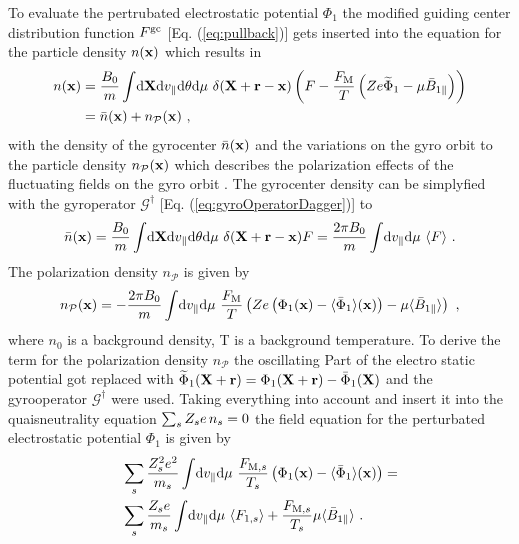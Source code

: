 To evaluate the pertrubated electrostatic potential $\Phi_1$ the modified guiding center distribution function $F^\mathrm{gc}$ [Eq. (\ref{eq:pullback})] gets inserted into the equation for the particle density $n(\boldsymbol{\mathbf{x}})$ which results in
\begin{gather}
	\begin{aligned}
		n(\boldsymbol{\mathbf{x}}) &= \frac{B_0}{m} \int \! \mathrm{d}\boldsymbol{\mathbf{X}}\mathrm{d}v_\parallel\mathrm{d}\theta\mathrm{d}\mu ~ \delta(\boldsymbol{\mathbf{X}} + \boldsymbol{\mathbf{r}} - \boldsymbol{\mathbf{x}}) \left(F - \frac{F_\mathrm{M}}{T}\left(Ze \widetilde{\Phi}_1 - \mu \bar{B}_{1\parallel}\right) \right)\\
		     &= \bar{n}(\boldsymbol{\mathbf{x}}) + n_\mathcal{P}(\boldsymbol{\mathbf{x}})~,
	\end{aligned}
	\label{densityPullback}
\end{gather}
with the density of the gyrocenter $\bar{n}(\boldsymbol{\mathbf{x}})$ and the variations on the gyro orbit to the particle density $n_\mathcal{P}(\boldsymbol{\mathbf{x}})$ which describes the polarization effects of the fluctuating fields on the gyro orbit \cite{Brizard2007}. The gyrocenter density can be simplyfied with the gyroperator $\mathcal{G}^\dagger$ [Eq. (\ref{eq:gyroOperatorDagger})] to
\begin{gather}
		\bar{n}(\boldsymbol{\mathbf{x}}) = \frac{B_0}{m} \int \! \mathrm{d}\boldsymbol{\mathbf{X}}\mathrm{d}v_\parallel\mathrm{d}\theta\mathrm{d}\mu ~ \delta(\boldsymbol{\mathbf{X}} + \boldsymbol{\mathbf{r}} - \boldsymbol{\mathbf{x}}) F = \frac{2\pi B_0}{m} \int \! \mathrm{d}v_\parallel\mathrm{d}\mu ~ \langle F\rangle~.
	\label{eq:gyrocenterDensity}
\end{gather}
The polarization density $n_\mathcal{P}$ is given by
\begin{gather}
	n_\mathcal{P}(\boldsymbol{\mathbf{x}}) =  - \frac{2\pi B_0}{m} \int \! \mathrm{d}v_\parallel\mathrm{d}\mu ~ \frac{F_\mathrm{M}}{T} \left( Ze \left(\Phi_1(\boldsymbol{\mathbf{x}}) - \langle\bar{\Phi}_1\rangle(\boldsymbol{\mathbf{x}}) \right) -  \mu \langle\bar{B}_{1\parallel}\rangle \right) ~,
	\label{eq:polarizationDensity}
\end{gather}
where $n_0$ is a background density, T is a background temperature. To derive the term for the polarization density $n_\mathcal{P}$ the oscillating Part of the electro static potential got replaced with $\widetilde{\Phi}_1(\boldsymbol{\mathbf{X}}+ \boldsymbol{\mathbf{r}}) = \Phi_1(\boldsymbol{\mathbf{X}} + \boldsymbol{\mathbf{r}}) - \bar{\Phi}_1 (\boldsymbol{\mathbf{X}})$ and the gyrooperator $\mathcal{G}^\dagger$ were used. Taking everything into account and insert it into the quaisneutrality equation $\sum_s Z_s e \, n_s = 0$ the field equation for the perturbated electrostatic potential $\Phi_1$ is given by
\begin{gather}
	\begin{aligned}
		&\sum_s \frac{Z^2_s e^2}{m_s} \int \! \mathrm{d}v_\parallel\mathrm{d}\mu ~ \frac{F_{\mathrm{M},s}}{T_s} \left(\Phi_1(\boldsymbol{\mathbf{x}}) - \langle\bar{\Phi}_1\rangle(\boldsymbol{\mathbf{x}}) \right) =  \\
		&\sum_s \frac{Z_s e}{m_s} \int \! \mathrm{d}v_\parallel\mathrm{d}\mu ~ \langle F_{1,s}\rangle + \frac{F_{\mathrm{M},s}}{T_s} \mu \langle\bar{B}_{1\parallel}\rangle ~.
	\end{aligned}
	\label{eq:fieldPotential}
\end{gather}

